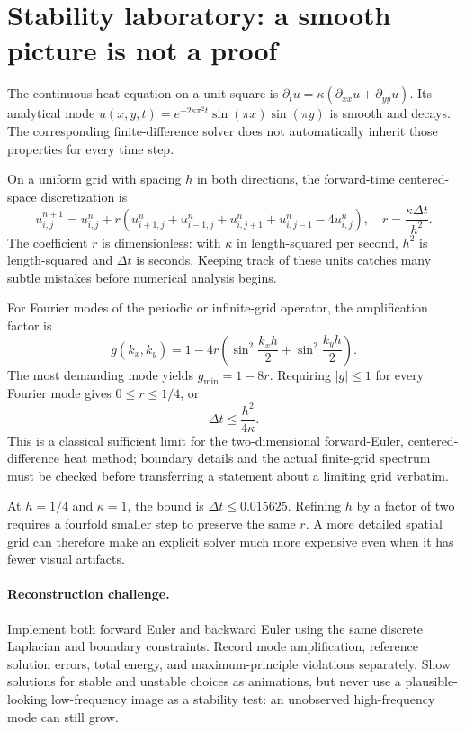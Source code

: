 \clearpage
\section*{Stability laboratory: a smooth picture is not a proof}
\noindent The continuous heat equation on a unit square is
\(\partial_tu=\kappa(\partial_{xx}u+\partial_{yy}u)\).
Its analytical mode
\(u(x,y,t)=e^{-2\kappa\pi^2 t}\sin(\pi x)\sin(\pi y)\)
is smooth and decays. The corresponding finite-difference solver
does not automatically inherit those properties for every time step.

On a uniform grid with spacing \(h\) in both directions, the
forward-time centered-space discretization is
\[
u_{i,j}^{n+1}=u_{i,j}^n+r
(u_{i+1,j}^n+u_{i-1,j}^n+u_{i,j+1}^n+u_{i,j-1}^n-4u_{i,j}^n),
\quad
r=\frac{\kappa\Delta t}{h^2}.
\]
The coefficient \(r\) is dimensionless: with \(\kappa\)
in length-squared per second, \(h^2\) is length-squared and
\(\Delta t\) is seconds. Keeping track of these units catches
many subtle mistakes before numerical analysis begins.

For Fourier modes of the periodic or infinite-grid operator,
the amplification factor is
\[
g(k_x,k_y)=1-4r\left(
\sin^2\frac{k_xh}{2}+\sin^2\frac{k_yh}{2}
\right).
\]
The most demanding mode yields \(g_{\min}=1-8r\).
Requiring \(\lvert g\rvert\le1\) for every Fourier mode
gives \(0\le r\le1/4\), or
\[
\Delta t\le\frac{h^2}{4\kappa}.
\]
This is a classical sufficient limit for the two-dimensional
forward-Euler, centered-difference heat method; boundary details
and the actual finite-grid spectrum must be checked before
transferring a statement about a limiting grid verbatim.

At \(h=1/4\) and \(\kappa=1\), the bound is
\(\Delta t\le0.015625\). Refining \(h\) by a factor of two
requires a fourfold smaller step to preserve the same \(r\).
A more detailed spatial grid can therefore make an explicit
solver much more expensive even when it has fewer visual artifacts.

\paragraph{Reconstruction challenge.}
Implement both forward Euler and backward Euler using the same
discrete Laplacian and boundary constraints.
Record mode amplification, reference solution errors, total energy,
and maximum-principle violations separately.
Show solutions for stable and unstable choices as animations, but
never use a plausible-looking low-frequency image as a stability test:
an unobserved high-frequency mode can still grow.


